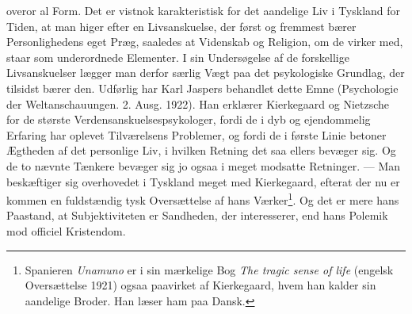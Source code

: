 \documentclass[12pt]{article}
\newcommand{\opage}[1]{\marginnote{\footnotesize\textit{[#1]}}}
\begin{document}
overor al Form. Det er vistnok karakteristisk for det aandelige Liv i
Tyskland for Tiden, at man higer efter en Livsanskuelse, der først og
fremmest bærer Personlighedens eget Præg, saaledes at Videnskab og
Religion, om de virker med, staar som underordnede Elementer. I sin
Undersøgelse af de forskellige Livsanskuelser lægger man derfor særlig
Vægt paa det psykologiske Grundlag, der tilsidst bærer den. Udførlig
har Karl Jaspers behandlet dette Emne (Psychologie der
Weltanschauungen. 2. Ausg. 1922). Han erklærer Kierkegaard og
Nietzsche for de største
\guillemotright{}Verdensanskuelsespsykologer\guillemotleft{}, fordi de i dyb
og ejendommelig Erfaring har oplevet Tilværelsens Problemer, og fordi
de i første Linie betoner Ægtheden af det personlige Liv, i hvilken
Retning det saa ellers bevæger sig. Og de to nævnte Tænkere bevæger
sig jo ogsaa i meget modsatte Retninger. --- Man beskæftiger sig
overhovedet i Tyskland meget med Kierkegaard, efterat der nu er kommen
en fuldstændig tysk Oversættelse af hans
\setcounter{footnote}{0}%
\opage{51}Værker\footnote{Spanieren \textit{Unamuno} er i sin mærkelige Bog \textit{The
tragic sense of life} (engelsk Oversættelse 1921) ogsaa paavirket af
Kierkegaard, hvem han kalder sin \guillemotright{}aandelige Broder\guillemotleft{}. Han læser ham paa
Dansk.}. Og det er mere hans Paastand, at Subjektiviteten er
Sandheden, der interesserer, end hans Polemik mod officiel Kristendom.
\end{document}
